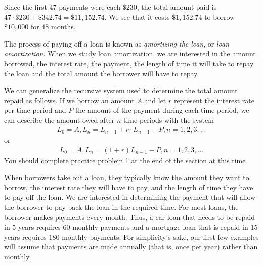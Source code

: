 \documentclass[10pt,]{book}
\theoremstyle{plain}
\theoremstyle{definition}
\theoremstyle{definition}
\theoremstyle{definition}
\numberwithin{equation}{section}
\begin{document}
\par
Since the first \(47\) payments were each \(\$230\), the total amount paid is \(47\cdot \$230 + \$342.74 = \$11,152.74\).  We see that it costs \(\$1,152.74\) to borrow \(\$10,000\) for \(48\) months.%
\par
The process of paying off a loan is known as \emph{amortizing the loan}, or \emph{loan amortization}. When we study loan amortization, we are interested in the amount borrowed, the interest rate, the payment, the length of time it will take to repay the loan and the total amount the borrower will have to repay.%
\par
We can generalize the recursive system used to determine the total amount repaid as follows.  If we borrow an amount \(A\) and let \(r\) represent the interest rate per time period and \(P\) the amount of the payment during each time period, we can describe the amount owed after \(n\) time periods with the system%
%
\begin{gather*}
L_0=A, L_n=L_{n-1} + r \cdot L_{n-1} - P , n=1,2,3,...
\end{gather*}
or%
%
\begin{gather*}
L_0=A,L_n=(1+r)L_{n-1} - P , n=1,2,3,...
\end{gather*}
You should complete practice problem 1 at the end of the section at this time%
\par
When borrowers take out a loan, they typically know the amount they want to borrow, the interest rate they will have to pay, and the length of time they have to pay off the loan.  We are interested in determining the payment that will allow the borrower to pay back the loan in the required time.  For most loans, the borrower makes payments every month. Thus, a car loan that needs to be repaid in \(5\) years requires \(60\) monthly payments and a mortgage loan that is repaid in \(15\) years requires \(180\) monthly payments. For simplicity's sake, our first few examples will assume that payments are made annually (that is, once per year) rather than monthly.%
\end{document}
